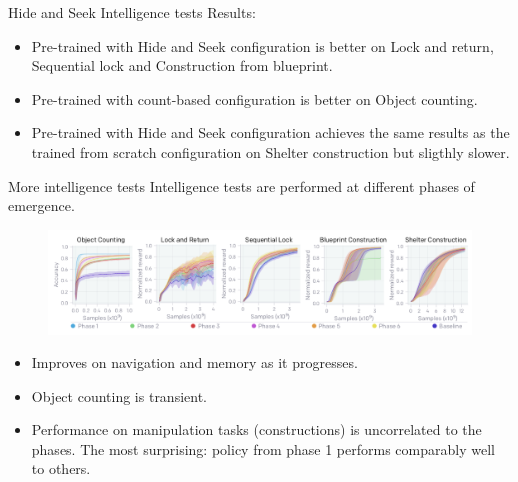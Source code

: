 \documentclass{beamer}
\begin{document}
\begin{frame}{Hide and Seek Intelligence tests}
Results:
    \begin{itemize}
    \item Pre-trained with Hide and Seek configuration is better on Lock and return, Sequential lock and Construction from blueprint.
    \item Pre-trained with count-based configuration is better on Object counting.
    \item Pre-trained with Hide and Seek configuration achieves the same results as the trained from scratch configuration on Shelter construction but sligthly slower.
    \end{itemize}{}
\end{frame}{}

\begin{frame}{More intelligence tests}
Intelligence tests are performed at different phases of emergence.
\begin{figure}
    \centering
    \includegraphics[scale=0.3]{FigureA5.png}
\end{figure}{}
\begin{itemize}
    \item Improves on navigation and memory as it progresses.
    \item Object counting is transient.
    \item Performance on manipulation tasks (constructions) is uncorrelated to the phases. The most surprising: policy from phase 1 performs comparably well to others.
\end{itemize}{}
\end{frame}{}
\end{document}
